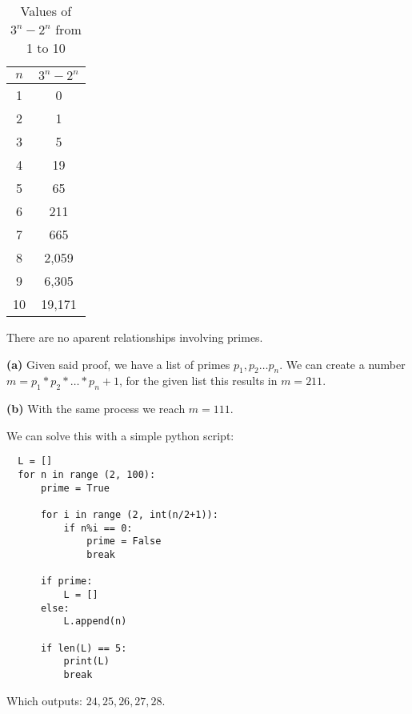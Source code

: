 \begin{table}[h]
  \centering
  \label{tab:3n_minus_2n}
  \begin{tabular}{|c|c|}
    \hline
    $n$ & $3^n - 2^n$\\
    \hline
    1 & 0\\
    2 & 1\\
    3 & 5\\
    4 & 19\\
    5 & 65\\
    6 & 211\\
    7 & 665\\
    8 & 2,059\\
    9 & 6,305\\
    10 & 19,171\\
    \hline
  \end{tabular}
  \caption{Values of $3^n - 2^n$ from 1 to 10}
\end{table}

There are no aparent relationships involving primes.  


\sol \textbf{(a)} Given said proof, we have a list of primes $p_1,p_2 \ldots p_n$.
We can create a number $m = p_1 * p_2 * \ldots * p_n + 1$, for the given list this results in $m = 211$.

\sol \textbf{(b)} With the same process we reach $m = 111$.


\sol 
We can solve this with a simple python script:
\begin{verbatim}
  L = []
  for n in range (2, 100):
      prime = True

      for i in range (2, int(n/2+1)):
          if n%i == 0:
              prime = False
              break

      if prime:
          L = []
      else:
          L.append(n)

      if len(L) == 5:
          print(L)
          break
\end{verbatim}
Which outputs: $24, 25, 26, 27, 28$.
 
